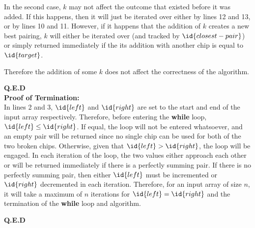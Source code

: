     In the second case, $k$ may not affect the outcome that existed before it was added.
    If this happens, then it will just be iterated over either by lines 12 and 13, or by lines 10 and 11.
    However, if it happens that the addition of $k$ creates a new best pairing, $k$ will either be iterated over (and tracked by $\id{closest-pair}$)
    or simply returned immediately if the its addition with another chip is equal to $\id{target}$.

    Therefore the addition of some $k$ does not affect the correctness of the algorithm.

    \textbf{Q.E.D}\\

    \textbf{Proof of Termination:} \\
    In lines 2 and 3, $\id{left}$ and $\id{right}$ are set to the start and end of the input array respectively.
    Therefore, before entering the \textbf{while} loop, $\id{left} \le \id{right}$.
    If equal, the loop will not be entered whatsoever, and an empty pair will be returned since no single chip can be used for both of the two broken chips.
    Otherwise, given that $\id{left} > \id{right}$, the loop will be engaged.
    In each iteration of the loop, the two values either approach each other or will be returned immediately if there is a perfectly summing pair.
    If there is no perfectly summing pair, then either $\id{left}$ must be incremented or $\id{right}$ decremented in each iteration.
    Therefore, for an input array of size $n$, it will take a maximum of $n$ iterations for $\id{left} = \id{right}$ and the termination of the \textbf{while} loop and algorithm.
    
    \textbf{Q.E.D}